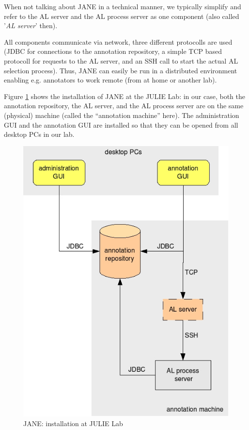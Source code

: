 \documentclass[DIV12,english,11pt,halfparskip]{scrartcl}
\begin{document}
When not talking about JANE in a technical manner, we typically
simplify and refer to the AL server and the AL process server as one
component (also called '\emph{AL server}' then).

All components communicate via network, three different protocolls are
used (JDBC for connections to the annotation repository, a simple TCP
based protocoll for requests to the AL server, and an SSH call to
start the actual AL selection process). Thus, JANE can easily be run
in a distributed environment enabling e.g. annotators to work remote
(from at home or another lab).

Figure \ref{fig:installation_julielab} shows the installation of JANE
at the JULIE Lab: in our case, both the annotation repository, the AL
server, and the AL process server are on the same (physical) machine
(called the ``annotation machine'' here). The administration GUI and
the annotation GUI are installed so that they can be opened from all
desktop PCs in our lab.


\begin{figure}[bt]
  \centering
  \includegraphics[scale=0.4]{figs/architecture_julielab.jpg}
  \caption{JANE: installation at JULIE Lab}
  \label{fig:installation_julielab}
\end{figure}
\end{document}
